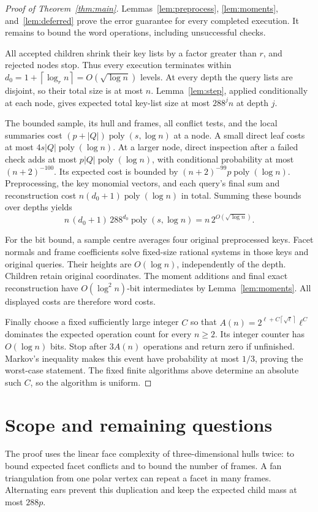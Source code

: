 \documentclass[notab,a4paper,UKenglish,numberwithinsect]{socg-lipics-v2021}
\newcommand{\poly}{\operatorname{poly}}
\newcommand{\ceil}[1]{\left\lceil #1\right\rceil}
\begin{document}
\begin{proof}[Proof of Theorem~\ref{thm:main}]
Lemmas~\ref{lem:preprocess}, \ref{lem:moments}, and~\ref{lem:deferred} prove the error guarantee for every completed execution. It remains to bound the word operations, including unsuccessful checks.

All accepted children shrink their key lists by a factor greater than $r$, and rejected nodes stop. Thus every execution terminates within $d_0=1+\ceil{\log_r n}=O(\sqrt{\log n})$ levels. At every depth the query lists are disjoint, so their total size is at most $n$. Lemma~\ref{lem:step}, applied conditionally at each node, gives expected total key-list size at most $288^j n$ at depth $j$.

The bounded sample, its hull and frames, all conflict tests, and the local summaries cost
$(p+|Q|)\poly(s,\log n)$ at a node. A small direct leaf costs at most $4s|Q|\poly(\log n)$. At a larger node, direct inspection after a failed check adds at most $p|Q|\poly(\log n)$, with conditional probability at most $(n+2)^{-100}$. Its expected cost is bounded by $(n+2)^{-99}p\poly(\log n)$. Preprocessing, the key monomial vectors, and each query's final sum and reconstruction cost $n(d_0+1)\poly(\log n)$ in total. Summing these bounds over depths yields
\[
 n\,(d_0+1)\,288^{d_0}\poly(s,\log n)
       =n\,2^{O(\sqrt{\log n})}.
\]

For the bit bound, a sample centre averages four original preprocessed keys. Facet normals and frame coefficients solve fixed-size rational systems in those keys and original queries. Their heights are $O(\log n)$, independently of the depth. Children retain original coordinates. The moment additions and final exact reconstruction have $O(\log^2 n)$-bit intermediates by Lemma~\ref{lem:moments}. All displayed costs are therefore word costs.

Finally choose a fixed sufficiently large integer $C$ so that
$A(n)=2^{\ell+C\ceil{\sqrt{\ell}}}\ell^C$
dominates the expected operation count for every $n\ge2$. Its integer counter has $O(\log n)$ bits. Stop after $3A(n)$ operations and return zero if unfinished. Markov's inequality makes this event have probability at most $1/3$, proving the worst-case statement. The fixed finite algorithms above determine an absolute such $C$, so the algorithm is uniform.
\end{proof}

\section{Scope and remaining questions}\label{sec:scope}
The proof uses the linear face complexity of three-dimensional hulls twice: to bound expected facet conflicts and to bound the number of frames. A fan triangulation from one polar vertex can repeat a facet in many frames. Alternating ears prevent this duplication and keep the expected child mass at most $288p$.
\end{document}

